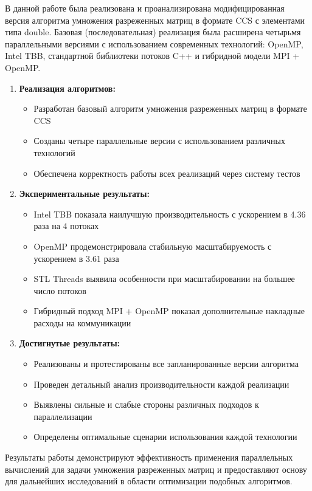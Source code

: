 \documentclass[12pt]{article}
\begin{document}
В данной работе была реализована и проанализирована модифицированная версия алгоритма умножения разреженных матриц в формате CCS с элементами типа double. Базовая (последовательная) реализация была расширена четырьмя параллельными версиями с использованием современных технологий: OpenMP, Intel TBB, стандартной библиотеки потоков C++ и гибридной модели MPI + OpenMP.
\begin{enumerate}
\item \textbf{Реализация алгоритмов:}
\begin{itemize}
\item Разработан базовый алгоритм умножения разреженных матриц в формате CCS
\item Созданы четыре параллельные версии с использованием различных технологий
\item Обеспечена корректность работы всех реализаций через систему тестов
\end{itemize}
\item \textbf{Экспериментальные результаты:}
\begin{itemize}
\item Intel TBB показала наилучшую производительность с ускорением в 4.36 раза на 4 потоках
\item OpenMP продемонстрировала стабильную масштабируемость с ускорением в 3.61 раза
\item STL Threads выявила особенности при масштабировании на большее число потоков
\item Гибридный подход MPI + OpenMP показал дополнительные накладные расходы на коммуникации
\end{itemize}
\item \textbf{Достигнутые результаты:}
\begin{itemize}
\item Реализованы и протестированы все запланированные версии алгоритма
\item Проведен детальный анализ производительности каждой реализации
\item Выявлены сильные и слабые стороны различных подходов к параллелизации
\item Определены оптимальные сценарии использования каждой технологии
\end{itemize}
\end{enumerate}
Результаты работы демонстрируют эффективность применения параллельных вычислений для задачи умножения разреженных матриц и предоставляют основу для дальнейших исследований в области оптимизации подобных алгоритмов.
\newpage
\end{document}
